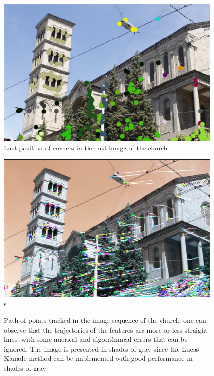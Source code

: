 \begin{figure}[h!]
\centering
\includegraphics[width=1\textwidth]{./Diagrams/last_frame_church_points.png}
\caption{Last position of corners in the last image of the church}
\label{fig:last_frame_church_points}
\end{figure}

\begin{figure}[h!]
\centering
\includegraphics[width=1\textwidth]{./Diagrams/track_points_church.png}s
\caption{Path of points tracked in the image sequence of the church, one can observe that the trajectories of the features are more or less straight lines, with some nuerical and algorithmical errors that can be ignored. The image is presented in shades of gray since the Lucas-Kanade method can be implemented with good performance in shades of gray}
\label{fig:track_points_church}
\end{figure}

